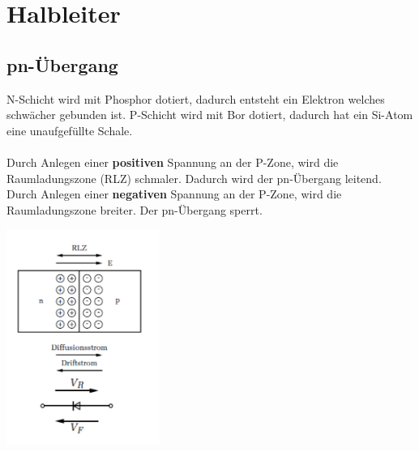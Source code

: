 \section{Halbleiter}
\subsection{pn-Übergang}
  \begin{minipage}{14cm}
    N-Schicht wird mit Phosphor dotiert, dadurch entsteht ein Elektron welches schwächer gebunden ist.
    P-Schicht wird mit Bor dotiert, dadurch hat ein Si-Atom eine unaufgefüllte Schale. \\ \\
    Durch Anlegen einer \textbf{positiven} Spannung an der P-Zone, wird die Raumladungszone (RLZ) schmaler. 
    Dadurch wird der pn-Übergang leitend.\\
    Durch Anlegen einer \textbf{negativen} Spannung an der P-Zone, wird die Raumladungszone breiter. 
    Der pn-Übergang sperrt.
  \end{minipage}
  \begin{minipage}{5cm}
    \includegraphics[width=5cm]{./bilder/pn_uebergang.png}
  \end{minipage}

